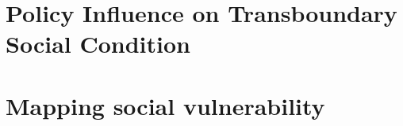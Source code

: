 \documentclass[draft]{article}
\begin{document}




\section{Policy Influence on Transboundary Social Condition}




\section{Mapping social vulnerability} %

\end{document}
